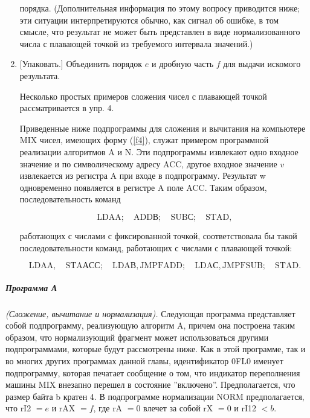 \begin{enumerate}[label=N{\arabic*}]
порядка. (Дополнительная информация по этому вопросу приводится ниже; эти ситуации интерпретируются обычно, как сигнал об ошибке, в том смысле, что результат не может быть представлен в виде нормализованного числа с плавающей точкой из требуемого интервала значений.)

\item\label{n7} [Упаковать.] Объединить порядок $e$ и дробную часть $f$ для выдачи искомого результата.

Несколько простых примеров сложения чисел с плавающей точкой рассматривается в упр. 4.

Приведенные ниже подпрограммы для сложения и вычитания на компьютере MIX чисел, имеющих форму (\ref{f4}), служат примером программной реализации алгоритмов A и N. Эти подпрограммы извлекают одно входное значение и по символическому адресу ACC, другое входное значение $v$ извлекается из регистра A при входе в подпрограмму. Результат w одновременно появляется в регистре A поле ACC. Таким образом, последовательность команд

\begin{center}
\begin{equation}\label{f7}
\mathrm{LDA A;\quad ADD В;\quad SUB С;\quad STA D,}
\end{equation}
\end{center}
работающих с числами с фиксированной точкой, соответствовала бы такой последовательности команд, работающих с числами с плавающей точкой:
\begin{center}
\begin{equation}\label{f8}
\mathrm{LDA A,\quad STA АСС;\quad LDA В, JMP FADD;\quad LDA С, JMP FSUB;\quad STA D.}
\end{equation}
\end{center}

\end{enumerate}

\subparagraph{Программа А} \textit{(Сложение, вычитание и нормализация).} Следующая программа представляет собой подпрограмму, реализующую алгоритм A, причем она построена таким образом, что нормализующий фрагмент может использоваться другими 
подпрограммами, которые будут рассмотрены ниже. Как в этой программе, так и во многих других программах данной главы, идентификатор 0FL0 именует подпрограмму, которая печатает сообщение о том, что индикатор переполнения машины MIX внезапно перешел в состояние ''включено''. Предполагается, что размер байта b кратен 4. В подпрограмме нормализации NORM предполагается, что rI2 $= e$ и rAX $= f$, где rA $= 0$ влечет за собой rX $= 0$ и rI12 $< b$.

